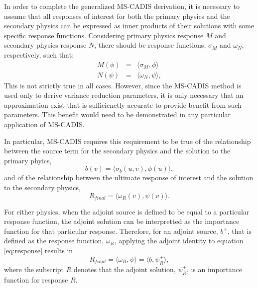 In order to complete the generalized MS-CADIS derivation, it is necessary to
assume that all responses of interest for both the primary physics and the
secondary physics can be expressed as inner products of their solutions with
some specific response functions.  Considering primary physics response $M$
and secondary physics response $N$, there should be response functions,
$\sigma_M$ and $\omega_N$, respectively, such that:
\begin{eqnarray}
   M(\phi) &=& \langle \sigma_M , \phi \rangle\\
   N(\psi) &=& \langle \omega_N , \psi \rangle,
\end{eqnarray}
This is not strictly true in all cases.  However, since the
MS-CADIS method is used only to derive variance reduction parameters, it is
only necessary that an approximation exist that is sufficienctly accurate to
provide benefit from such parameters.  This benefit would need to be
demonstrated in any particular application of MS-CADIS.

In particular, MS-CADIS requires this requirement to be true of the
relationship between the source term for the secondary physics and the
solution to the primary phyics,
\begin{equation}\label{eq:coupling}
  b(v) = \langle \sigma_b(u,v), \phi(u) \rangle,
\end{equation}
and of the relationship between the ultimate response of interest and the
solution to the secondary physics,
\begin{equation} \label{eq:response}
  R_{final} = \langle \omega_R(v), \psi(v) \rangle.
\end{equation}

For either physics, when the adjoint source is defined to be equal to a
particular response function, the adjoint solution can be interpretted as the
importance function for that particular response.  Therefore, for an adjoint source,
$b^{+}$, that is defined as the response function, $\omega_R$, applying the
adjoint identity to equation \ref{eq:response} results in
\begin{equation}
  R_{final} = \langle \omega_R, \psi \rangle = \langle b, \psi_R^{+}\rangle,
\end{equation}
where the subscript $R$ denotes that the adjoint solution, $\psi_R^{+}$, is an
importance function for response $R$.

